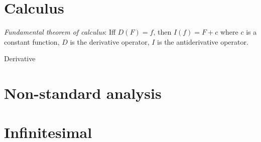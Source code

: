 \section{Calculus}

%
\emph{Fundamental theorem of calculus}:
Iff \(D(F) = f\), then \(I(f) = F + c\) where \(c\) is a constant function,
\(D\) is the derivative operator, \(I\) is the antiderivative operator.

Derivative

\section{Non-standard analysis}

\section{Infinitesimal}
